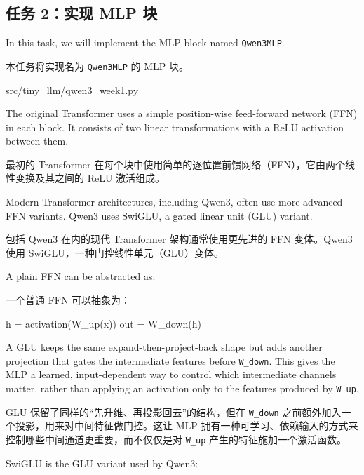 \documentclass[11pt,a4paper]{article}
\newenvironment{zhpar}{%
  \par\smallskip\begingroup\color{zhcolor}\small\ignorespaces%
}{\endgroup\par\smallskip}
\begin{document}
\subsection*{任务 2：实现 MLP 块}

In this task, we will implement the MLP block named \texttt{Qwen3MLP}.

\begin{zhpar}
本任务将实现名为 \texttt{Qwen3MLP} 的 MLP 块。
\end{zhpar}
\begin{codeblock}
src/tiny_llm/qwen3_week1.py
\end{codeblock}

The original Transformer uses a simple position-wise feed-forward network (FFN) in each block. It consists of two linear transformations with a ReLU activation between them.

\begin{zhpar}
最初的 Transformer 在每个块中使用简单的逐位置前馈网络（FFN），它由两个线性变换及其之间的 ReLU 激活组成。
\end{zhpar}
Modern Transformer architectures, including Qwen3, often use more advanced FFN variants. Qwen3 uses SwiGLU, a gated linear unit (GLU) variant.

\begin{zhpar}
包括 Qwen3 在内的现代 Transformer 架构通常使用更先进的 FFN 变体。Qwen3 使用 SwiGLU，一种门控线性单元（GLU）变体。
\end{zhpar}
A plain FFN can be abstracted as:

\begin{zhpar}
一个普通 FFN 可以抽象为：
\end{zhpar}
\begin{codeblock}
h = activation(W_up(x))
out = W_down(h)
\end{codeblock}

A GLU keeps the same expand-then-project-back shape but adds another projection that gates the intermediate features before \texttt{W\_down}. This gives the MLP a learned, input-dependent way to control which intermediate channels matter, rather than applying an activation only to the features produced by \texttt{W\_up}.

\begin{zhpar}
GLU 保留了同样的“先升维、再投影回去”的结构，但在 \texttt{W\_down} 之前额外加入一个投影，用来对中间特征做门控。这让 MLP 拥有一种可学习、依赖输入的方式来控制哪些中间通道更重要，而不仅仅是对 \texttt{W\_up} 产生的特征施加一个激活函数。
\end{zhpar}
SwiGLU is the GLU variant used by Qwen3:
\end{document}
